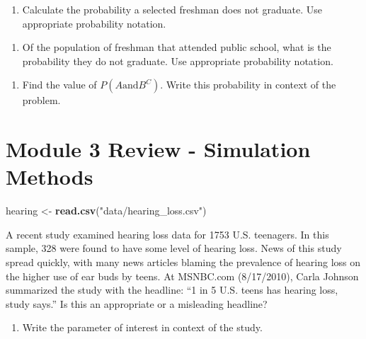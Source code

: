 \documentclass[
]{report}
\newenvironment{Shaded}{\begin{snugshade}}{\end{snugshade}}
\newcommand{\FunctionTok}[1]{\textcolor[rgb]{0.13,0.29,0.53}{\textbf{#1}}}
\newcommand{\NormalTok}[1]{#1}
\newcommand{\OtherTok}[1]{\textcolor[rgb]{0.56,0.35,0.01}{#1}}
\newcommand{\StringTok}[1]{\textcolor[rgb]{0.31,0.60,0.02}{#1}}
\providecommand{\tightlist}{%
  \setlength{\itemsep}{0pt}\setlength{\parskip}{0pt}}
\begin{document}
\begin{enumerate}
\def\labelenumi{\alph{enumi}.}
\setcounter{enumi}{3}
\tightlist
\item
  Calculate the probability a selected freshman does not graduate. Use appropriate probability notation.
\end{enumerate}

\vspace{1in}

\begin{enumerate}
\def\labelenumi{\alph{enumi}.}
\setcounter{enumi}{4}
\tightlist
\item
  Of the population of freshman that attended public school, what is the probability they do not graduate. Use appropriate probability notation.
\end{enumerate}

\vspace{1in}

\begin{enumerate}
\def\labelenumi{\alph{enumi}.}
\setcounter{enumi}{5}
\tightlist
\item
  Find the value of \(P(A \text{and} B^C)\). Write this probability in context of the problem.
\end{enumerate}

\newpage

\section{Module 3 Review - Simulation Methods}\label{module-3-review---simulation-methods}

\begin{Shaded}
\begin{Highlighting}[]
\NormalTok{hearing }\OtherTok{\textless{}{-}} \FunctionTok{read.csv}\NormalTok{(}\StringTok{"data/hearing\_loss.csv"}\NormalTok{)}
\end{Highlighting}
\end{Shaded}

A recent study examined hearing loss data for 1753 U.S. teenagers. In this sample, 328 were found to have some level of hearing loss. News of this study spread quickly, with many news articles blaming the prevalence of hearing loss on the higher use of ear buds by teens. At MSNBC.com (8/17/2010), Carla Johnson summarized the study with the headline: ``1 in 5 U.S. teens has hearing loss, study says.'' Is this an appropriate or a misleading headline?

\begin{enumerate}
\def\labelenumi{\arabic{enumi}.}
\tightlist
\item
  Write the parameter of interest in context of the study.
\end{enumerate}
\end{document}
